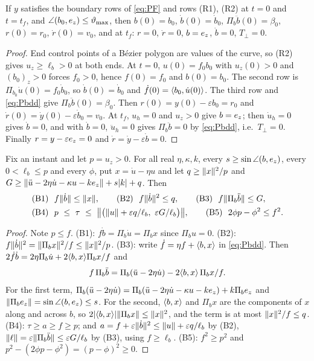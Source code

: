 \begin{lemma}\label{lem:F-bc}
If $y$ satisfies the boundary rows of \eqref{eq:PF} and rows (R1), (R2) at $t=0$ and $t=t_f$, and $\angle(b_0,e_z)\le\vartheta_{\max}$,
then $b(0)=b_0$, $\dot b(0)=\dot b_0$, $\Pi_b\ddot b(0)=\beta_0$, $r(0)=r_0$, $\dot r(0)=v_0$, and at $t_f$: $r=0$, $\dot r=0$, $b=e_z$,
$\dot b=0$, $T_\perp=0$.
\end{lemma}
\begin{proof}
End control points of a B\'ezier polygon are values of the curve, so (R2) gives $u_z\ge\ell_b>0$ at both ends. At $t=0$, $u(0)=f_0b_0$
with $u_z(0)>0$ and $(b_0)_z>0$ forces $f_0>0$, hence $f(0)=f_0$ and $b(0)=b_0$. The second row is $\Pi_{b_0}\dot u(0)=f_0\dot b_0$, so
$\dot b(0)=\dot b_0$ and $\dot f(0)=\langle b_0,\dot u(0)\rangle$. The third row and \eqref{eq:Pbdd} give $\Pi_b\ddot b(0)=\beta_0$. Then
$r(0)=y(0)-\varepsilon b_0=r_0$ and $\dot r(0)=\dot y(0)-\varepsilon\dot b_0=v_0$. At $t_f$, $u_h=0$ and $u_z>0$ give $b=e_z$; then
$\dot u_h=0$ gives $\dot b=0$, and with $\dot b=0$, $\ddot u_h=0$ gives $\Pi_b\ddot b=0$ by \eqref{eq:Pbdd}, i.e.\ $T_\perp=0$. Finally
$r=y-\varepsilon e_z=0$ and $\dot r=\dot y-\varepsilon\dot b=0$.
\end{proof}

\begin{lemma}\label{lem:F-bounds}
Fix an instant and let $p=u_z>0$. For all real $\eta,\kappa,k$, every $s\ge\sin\angle(b,e_z)$, every $0<\ell_b\le p$ and every $\phi$, put
$x=\dot u-\eta u$ and let $q\ge\lVert x\rVert^2/p$ and $G\ge\lVert \ddot u-2\eta\dot u-\kappa u-ke_z\rVert+s|k|+q$. Then
\begin{align*}
&\text{(B1)}\ \ f\lVert \dot b\rVert\le\lVert x\rVert,\qquad
\text{(B2)}\ \ f\lVert \dot b\rVert^2\le q,\qquad
\text{(B3)}\ \ f\lVert \Pi_b\ddot b\rVert\le G,\\
&\text{(B4)}\ \ p\ \le\ \tau\ \le\ \bigl\|\bigl(\lVert u\rVert+\varepsilon q/\ell_b,\ \varepsilon G/\ell_b\bigr)\bigr\|,\qquad
\text{(B5)}\ \ 2\phi p-\phi^2\le f^2 .
\end{align*}
\end{lemma}
\begin{proof}
Note $p\le f$. (B1): $f\dot b=\Pi_b\dot u=\Pi_bx$ since $\Pi_bu=0$. (B2): $f\lVert \dot b\rVert^2=\lVert \Pi_bx\rVert^2/f\le\lVert x\rVert^2/p$.
(B3): write $\dot f=\eta f+\langle b,x\rangle$ in \eqref{eq:Pbdd}. Then $2\dot f\dot b=2\eta\Pi_b\dot u+2\langle b,x\rangle\Pi_bx/f$ and
\[
f\,\Pi_b\ddot b=\Pi_b(\ddot u-2\eta\dot u)-2\langle b,x\rangle\,\Pi_bx/f .
\]
For the first term, $\Pi_b(\ddot u-2\eta\dot u)=\Pi_b(\ddot u-2\eta\dot u-\kappa u-ke_z)+k\Pi_be_z$ and $\lVert \Pi_be_z\rVert=\sin\angle(b,e_z)\le s$.
For the second, $\langle b,x\rangle$ and $\Pi_bx$ are the components of $x$ along and across $b$, so $2|\langle b,x\rangle|\lVert \Pi_bx\rVert\le\lVert x\rVert^2$, and the
term is at most $\lVert x\rVert^2/f\le q$. (B4): $\tau\ge a\ge f\ge p$; and $a=f+\varepsilon\lVert \dot b\rVert^2\le\lVert u\rVert+\varepsilon q/\ell_b$ by (B2),
$\lVert \ell\rVert=\varepsilon\lVert \Pi_b\ddot b\rVert\le\varepsilon G/\ell_b$ by (B3), using $f\ge\ell_b$. (B5): $f^2\ge p^2$ and $p^2-(2\phi p-\phi^2)=(p-\phi)^2\ge0$.
\end{proof}

